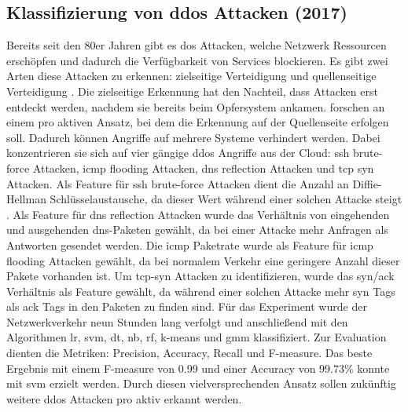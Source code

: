 \documentclass[
    12pt, %
    DIV10,
    ngerman, %
    a4paper, %
    oneside, %
    titlepage, %
    parskip=half, %
    headings=normal, %
    listof=totoc, %
    bibliography=totoc, %
    index=totoc, %
    captions=tableheading, %
    final %
]{scrreprt}
\begin{document}
\subsection{Klassifizierung von \acs{ddos} Attacken (2017)}
Bereits seit den 80er Jahren gibt es \ac{dos} Attacken, welche Netzwerk Ressourcen erschöpfen und dadurch die Verfügbarkeit von Services blockieren. Es gibt zwei Arten diese Attacken zu erkennen: zielseitige Verteidigung und quellenseitige Verteidigung \parencite{He2017}. Die zielseitige Erkennung hat den Nachteil, dass Attacken erst entdeckt werden, nachdem sie bereits beim Opfersystem ankamen. \textcite{He2017} forschen an einem pro aktiven Ansatz, bei dem die Erkennung auf der Quellenseite erfolgen soll. Dadurch können Angriffe auf mehrere Systeme verhindert werden. Dabei konzentrieren sie sich auf vier gängige \ac{ddos} Angriffe aus der Cloud: \ac{ssh} brute-force Attacken, \ac{icmp} flooding Attacken, \ac{dns} reflection Attacken und \ac{tcp} \ac{syn} Attacken. Als Feature für \ac{ssh} brute-force Attacken dient die Anzahl an Diffie-Hellman Schlüsselaustausche, da dieser Wert während einer solchen Attacke steigt \parencite{He2017}. Als Feature für \ac{dns} reflection Attacken wurde das Verhältnis von eingehenden und ausgehenden \ac{dns}-Paketen gewählt, da bei einer Attacke mehr Anfragen als Antworten gesendet werden. Die \ac{icmp} Paketrate wurde als Feature für \ac{icmp} flooding Attacken gewählt, da bei normalem Verkehr eine geringere Anzahl dieser Pakete vorhanden ist. Um \ac{tcp}-\ac{syn} Attacken zu identifizieren, wurde das \ac{syn}/\ac{ack} Verhältnis als Feature gewählt, da während einer solchen Attacke mehr \ac{syn} Tags als \ac{ack} Tags in den Paketen zu finden sind. Für das Experiment wurde der Netzwerkverkehr neun Stunden lang verfolgt und anschlie{\ss}end mit den Algorithmen \ac{lr}, \ac{svm}, \ac{dt}, \ac{nb}, \ac{rf}, k-means und \ac{gmm} klassifiziert. Zur Evaluation dienten die Metriken: Precision, Accuracy, Recall und F-measure. Das beste Ergebnis mit einem F-measure von 0.99 und einer Accuracy von 99.73\% konnte mit \ac{svm} erzielt werden.
Durch diesen vielversprechenden Ansatz sollen zukünftig weitere \ac{ddos} Attacken pro aktiv erkannt werden.
%
\end{document}
